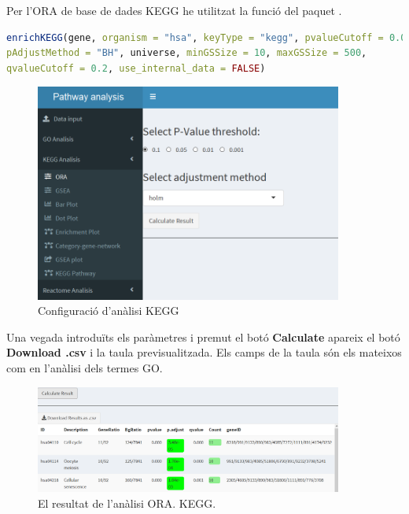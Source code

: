 Per l'ORA de base de dades KEGG he utilitzat la funció  del paquet . 

\begin{lstlisting}[language=R]
enrichKEGG(gene, organism = "hsa", keyType = "kegg", pvalueCutoff = 0.05, 
pAdjustMethod = "BH", universe, minGSSize = 10, maxGSSize = 500, 
qvalueCutoff = 0.2, use_internal_data = FALSE)
\end{lstlisting}



\begin{figure}[H]
\centering
\includegraphics[width=0.9\textwidth]{App_F7_Items_KEGG_ORA.png} 
\caption{Configuració d'anàlisi KEGG}
\end{figure}



Una vegada introduïts els paràmetres i premut el botó \textbf{Calculate} apareix el botó \textbf{Download .csv} i la taula previsualitzada. Els camps de la taula són els mateixos com en l'anàlisi dels termes GO.
\begin{figure}[H]
\centering
\includegraphics[width=0.9\textwidth]{App_F9_Items_KEGG_ORA_Table.png} 
\caption{El resultat de l'anàlisi ORA. KEGG.}
\end{figure}

